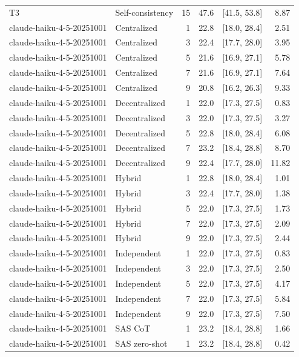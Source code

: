 \begin{tabular}{@{}llrrrr@{}}
T3 & Self-consistency & 15 & 47.6 & [41.5, 53.8] & 8.87 \\
claude-haiku-4-5-20251001 & Centralized & 1 & 22.8 & [18.0, 28.4] & 2.51 \\
claude-haiku-4-5-20251001 & Centralized & 3 & 22.4 & [17.7, 28.0] & 3.95 \\
claude-haiku-4-5-20251001 & Centralized & 5 & 21.6 & [16.9, 27.1] & 5.78 \\
claude-haiku-4-5-20251001 & Centralized & 7 & 21.6 & [16.9, 27.1] & 7.64 \\
claude-haiku-4-5-20251001 & Centralized & 9 & 20.8 & [16.2, 26.3] & 9.33 \\
claude-haiku-4-5-20251001 & Decentralized & 1 & 22.0 & [17.3, 27.5] & 0.83 \\
claude-haiku-4-5-20251001 & Decentralized & 3 & 22.0 & [17.3, 27.5] & 3.27 \\
claude-haiku-4-5-20251001 & Decentralized & 5 & 22.8 & [18.0, 28.4] & 6.08 \\
claude-haiku-4-5-20251001 & Decentralized & 7 & 23.2 & [18.4, 28.8] & 8.70 \\
claude-haiku-4-5-20251001 & Decentralized & 9 & 22.4 & [17.7, 28.0] & 11.82 \\
claude-haiku-4-5-20251001 & Hybrid & 1 & 22.8 & [18.0, 28.4] & 1.01 \\
claude-haiku-4-5-20251001 & Hybrid & 3 & 22.4 & [17.7, 28.0] & 1.38 \\
claude-haiku-4-5-20251001 & Hybrid & 5 & 22.0 & [17.3, 27.5] & 1.73 \\
claude-haiku-4-5-20251001 & Hybrid & 7 & 22.0 & [17.3, 27.5] & 2.09 \\
claude-haiku-4-5-20251001 & Hybrid & 9 & 22.0 & [17.3, 27.5] & 2.44 \\
claude-haiku-4-5-20251001 & Independent & 1 & 22.0 & [17.3, 27.5] & 0.83 \\
claude-haiku-4-5-20251001 & Independent & 3 & 22.0 & [17.3, 27.5] & 2.50 \\
claude-haiku-4-5-20251001 & Independent & 5 & 22.0 & [17.3, 27.5] & 4.17 \\
claude-haiku-4-5-20251001 & Independent & 7 & 22.0 & [17.3, 27.5] & 5.84 \\
claude-haiku-4-5-20251001 & Independent & 9 & 22.0 & [17.3, 27.5] & 7.50 \\
claude-haiku-4-5-20251001 & SAS CoT & 1 & 23.2 & [18.4, 28.8] & 1.66 \\
claude-haiku-4-5-20251001 & SAS zero-shot & 1 & 23.2 & [18.4, 28.8] & 0.42 \\

\end{tabular}
